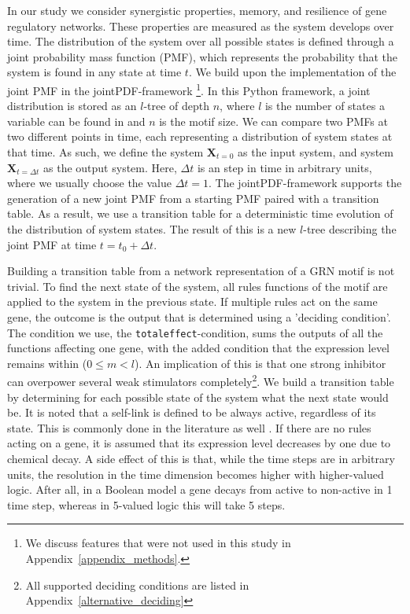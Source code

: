 \documentclass[../main.tex]{subfiles}
\begin{document}
In our study we consider synergistic properties, memory, and resilience of gene regulatory networks.
These properties are measured as the system develops over time.
The distribution of the system over all possible states is defined through a joint probability mass function (PMF), which represents the probability that the system is found in any state at time $t$.
We build upon the implementation of the joint PMF in the jointPDF-framework \cite{jointpdf}\footnote{We discuss features that were not used in this study in Appendix~\ref{appendix_methods}.}.
In this Python framework, a joint distribution is stored as an $l$-tree of depth $n$, where $l$ is the number of states a variable can be found in and $n$ is the motif size.
We can compare two PMFs at two different points in time, each representing a distribution of system states at that time.
As such, we define the system $\mathbf{X}_{t=0}$ as the input system, and system $\mathbf{X}_{t=\Delta t}$ as the output system.
Here, $\Delta t$ is an step in time in arbitrary units, where we usually choose the value $\Delta t = 1$.
The jointPDF-framework supports the generation of a new joint PMF from a starting PMF paired with a transition table.
As a result, we use a transition table for a deterministic time evolution of the distribution of system states.
The result of this is a new $l$-tree describing the joint PMF at time $t=t_0+\Delta t$.

Building a transition table from a network representation of a GRN motif is not trivial.
To find the next state of the system, all rules functions of the motif are applied to the system in the previous state.
If multiple rules act on the same gene, the outcome is the output that is determined using a 'deciding condition'.
The condition we use, the \texttt{totaleffect}-condition, sums the outputs of all the functions affecting one gene, with the added condition that the expression level remains within ($0 \le m < l$).
An implication of this is that one strong inhibitor can overpower several weak stimulators completely\footnote{All supported deciding conditions are listed in Appendix~\ref{alternative_deciding}}.
We build a transition table by determining for each possible state of the system what the next state would be.
It is noted that a self-link is defined to be always active, regardless of its state.
This is commonly done in the literature as well \cite{thomas1995dynamical, zhou2016relative}.
If there are no rules acting on a gene, it is assumed that its expression level decreases by one due to chemical decay.
A side effect of this is that, while the time steps are in arbitrary units, the resolution in the time dimension becomes higher with higher-valued logic.
After all, in a Boolean model a gene decays from active to non-active in 1 time step, whereas in 5-valued logic this will take 5 steps.
\end{document}

